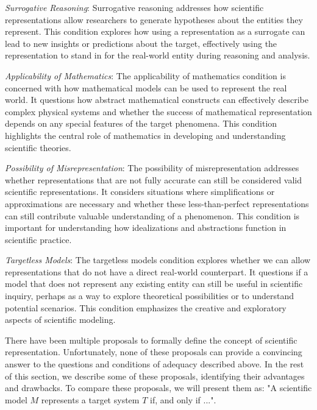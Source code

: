 \emph{Surrogative Reasoning}: Surrogative reasoning addresses how scientific representations allow researchers to generate hypotheses about the entities they represent. This condition explores how using a representation as a surrogate can lead to new insights or predictions about the target, effectively using the representation to stand in for the real-world entity during reasoning and analysis.

\emph{Applicability of Mathematics}: The applicability of mathematics condition is concerned with how mathematical models can be used to represent the real world. It questions how abstract mathematical constructs can effectively describe complex physical systems and whether the success of mathematical representation depends on any special features of the target phenomena. This condition highlights the central role of mathematics in developing and understanding scientific theories.

\emph{Possibility of Misrepresentation}: The possibility of misrepresentation addresses whether representations that are not fully accurate can still be considered valid scientific representations. It considers situations where simplifications or approximations are necessary and whether these less-than-perfect representations can still contribute valuable understanding of a phenomenon. This condition is important for understanding how idealizations and abstractions function in scientific practice.

\emph{Targetless Models}: The targetless models condition explores whether we can allow representations that do not have a direct real-world counterpart. It questions if a model that does not represent any existing entity can still be useful in scientific inquiry, perhaps as a way to explore theoretical possibilities or to understand potential scenarios. This condition emphasizes the creative and exploratory aspects of scientific modeling.

There have been multiple proposals to formally define the concept of scientific representation. Unfortunately, none of these proposals can provide a convincing answer to the questions and conditions of adequacy described above. In the rest of this section, we describe some of these proposals, identifying their advantages and drawbacks. To compare these proposals, we will present them as: "A scientific model $M$ represents a target system $T$ if, and only if ...".

